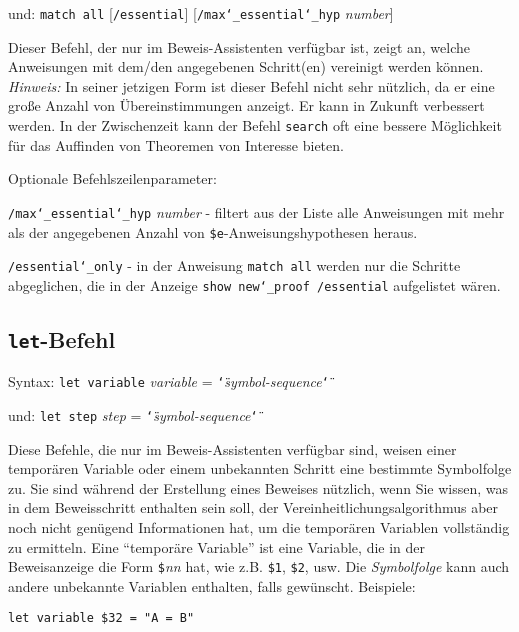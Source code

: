     und:  \texttt{match all} [\texttt{/essential}]
          [\texttt{/max{\char`\_}essential{\char`\_}hyp} {\em number}]

Dieser Befehl, der nur im Beweis-Assistenten verfügbar ist, zeigt an, welche Anweisungen mit dem/den angegebenen Schritt(en) vereinigt werden können.  {\em Hinweis:} In seiner jetzigen Form ist dieser Befehl nicht sehr nützlich, da er eine große Anzahl von Übereinstimmungen anzeigt. Er kann in Zukunft verbessert werden.  In der Zwischenzeit kann der Befehl \texttt{search} oft eine bessere Möglichkeit für das Auffinden von Theoremen von Interesse bieten. 

Optionale Befehlszeilenparameter:

    \texttt{/max{\char`\_}essential{\char`\_}hyp} {\em number} - filtert aus der Liste alle Anweisungen mit mehr als der angegebenen Anzahl von \texttt{\$e}-Anweisungshypothesen heraus.

    \texttt{/essential{\char`\_}only} - in der Anweisung \texttt{match all} werden nur die Schritte abgeglichen, die in der Anzeige \texttt{show new{\char`\_}proof /essential} aufgelistet wären.


\subsection{\texttt{let}-Befehl}

Syntax: \texttt{let variable} {\em variable} = \texttt{\char`\"}{\em symbol-sequence}\texttt{\char`\"}

  und: \texttt{let step} {\em step} = \texttt{\char`\"}{\em symbol-sequence}\texttt{\char`\"}

Diese Befehle, die nur im Beweis-Assistenten verfügbar sind, weisen einer temporären Variable oder einem unbekannten Schritt eine bestimmte Symbolfolge zu.  Sie sind während der Erstellung eines Beweises nützlich, wenn Sie wissen, was in dem Beweisschritt enthalten sein soll, der Vereinheitlichungsalgorithmus aber noch nicht genügend Informationen hat, um die temporären Variablen vollständig zu ermitteln.  Eine "`temporäre Variable"' ist eine Variable, die in der Beweisanzeige die Form \texttt{\$}{\em nn} hat, wie z.B. \texttt{\$1}, \texttt{\$2}, usw.  Die {\em Symbolfolge} kann auch andere unbekannte Variablen enthalten, falls gewünscht.  Beispiele: 

    \verb/let variable $32 = "A = B"/


